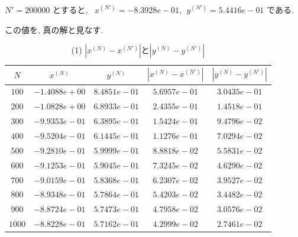 \documentclass[11pt]{jsarticle}
\begin{document}
$N' = 200000$ とすると, \ $x^{(N')} = -8.3928e-01, \ \ y^{(N')} = 5.4416e-01$ である. \par
この値を, 真の解と見なす. 
\begin{table}[htbp]
\centering
\begin{tabular}{|c||c|c|c|c|} \hline
\textbf{$N$} & \textbf{$x^{(N)}$} & \textbf{$y^{(N)}$} & \textbf{$|x^{(N)}-x^{(N')}|$} & \textbf{$|y^{(N)}-y^{(N')}|$} \\ \hline
$100$ & $-1.4088e+00$ & $8.4851e-01$ & $5.6957e-01$ & $3.0435e-01$ \\ \hline
$200$ & $-1.0828e+00$ & $6.8933e-01$ & $2.4355e-01$ & $1.4518e-01$ \\ \hline
$300$ & $-9.9353e-01$ & $6.3895e-01$ & $1.5424e-01$ & $9.4796e-02$ \\ \hline
$400$ & $-9.5204e-01$ & $6.1445e-01$ & $1.1276e-01$ & $7.0294e-02$ \\ \hline
$500$ & $-9.2810e-01$ & $5.9999e-01$ & $8.8818e-02$ & $5.5831e-02$ \\ \hline
$600$ & $-9.1253e-01$ & $5.9045e-01$ & $7.3245e-02$ & $4.6290e-02$ \\ \hline
$700$ & $-9.0159e-01$ & $5.8368e-01$ & $6.2307e-02$ & $3.9527e-02$ \\ \hline
$800$ & $-8.9348e-01$ & $5.7864e-01$ & $5.4203e-02$ & $3.4482e-02$ \\ \hline
$900$ & $-8.8724e-01$ & $5.7473e-01$ & $4.7958e-02$ & $3.0576e-02$ \\ \hline
$1000$ & $-8.8228e-01$ & $5.7162e-01$ & $4.2999e-02$ & $2.7461e-02$ \\ \hline
\end{tabular}
\caption{(1) $|x^{(N)}-x^{(N')}|$と$|y^{(N)}-y^{(N')}|$}
\end{table}
\end{document}
